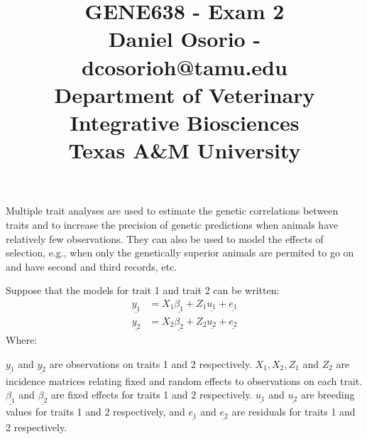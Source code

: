 \documentclass[12pt,a4paper]{paper}
\begin{document}
\title{GENE638 - Exam 2\\\small{Daniel Osorio - dcosorioh@tamu.edu\\Department of Veterinary Integrative Biosciences\\Texas A\&M University}}
\maketitle

Multiple trait analyses are used to estimate the genetic correlations between traits and to increase the precision of genetic predictions when animals have relatively few observations. They can also be used to model the effects of selection, e.g., when only the genetically superior animals are permited to go on and have second and third records, etc.

Suppose that the models for trait 1 and trait 2 can be written:
\begin{equation}
\begin{split}
\underline{y_{1}} &= X_{1}\underline{\beta_{1}} + Z_{1}\underline{u_{1}} + \underline{e_{1}}\\
\underline{y_{2}} &= X_{2}\underline{\beta_{2}} + Z_{2}\underline{u_{2}} + \underline{e_{2}}
\end{split}
\end{equation}
Where:

$\underline{y_{1}}$ and $\underline{y_{2}}$ are observations on traits 1 and 2 respectively. $X_{1}, X_{2}, Z_{1}$ and $Z_{2}$ are incidence matrices relating fixed and random effects to observations on each trait. $\underline{\beta_{1}}$ and $\underline{\beta_{2}}$ are fixed effects for traits 1 and 2 respectively. $\underline{u_{1}}$ and $\underline{u_{2}}$ are breeding values for traits 1 and 2 respectively, and $\underline{e_{1}}$ and $\underline{e_{2}}$ are residuals for traits 1 and 2 respectively.
\end{document}
